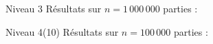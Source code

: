 \begin{frame}{Niveau 3}
Résultats sur $n=1\,000\,000$ parties :
\begin{center}
\end{center}
\end{frame}


\begin{frame}{Niveau 4(10)}
Résultats sur $n=100\,000$ parties :
\begin{center}
\end{center}
\end{frame}

